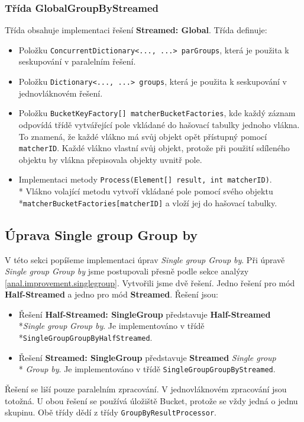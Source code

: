 \subsubsection{Třída GlobalGroupByStreamed}

Třída obsahuje implementaci řešení \textbf{Streamed: Global}.
Třída definuje:
\begin{itemize}
\item Položku \texttt{ConcurrentDictionary<..., ...> parGroups}, která je použita k seskupování v paralelním řešení.
\item Položku \texttt{Dictionary<..., ...> groups}, která je použita k seskupování v jednovláknovém řešení.
\item Položku \texttt{BucketKeyFactory[] matcherBucketFactories}, kde každý záznam odpovídá třídě vytvářející pole vkládané do hašovací tabulky jednoho vlákna.
To znamená, že každé vlákno má svůj objekt opět přístupný pomocí \texttt{matcherID}.
Každé vlákno vlastní svůj objekt, protože při použití sdíleného objektu by vlákna přepisovala objekty uvnitř pole.
\item Implementaci metody \texttt{Process(Element[] result, int matcherID)}.\\*
Vlákno volající metodu vytvoří vkládané pole pomocí svého objektu \\*\texttt{matcherBucketFactories[matcherID]} a vloží jej do hašovací tabulky.
\end{itemize}

\subsection{Úprava Single group Group by}

V této sekci popíšeme implementaci úprav \textit{Single group Group by}.
Při úpravě \textit{Single group Group by} jsme postupovali přesně podle sekce analýzy \ref{anal.improvement.singlegroup}.
Vytvořili jsme dvě řešení.
Jedno řešení pro mód \textbf{Half-Streamed} a jedno pro mód \textbf{Streamed}.
Řešení jsou:
\begin{itemize}
\item Řešení \textbf{Half-Streamed: SingleGroup} představuje \textbf{Half-Streamed} \\*\textit{Single} \textit{group} \textit{Group by}.
Je implementováno v třídě \\*\texttt{SingleGroupGroupByHalfStreamed}.
\item Řešení \textbf{Streamed: SingleGroup} představuje \textbf{Streamed} \textit{Single group}\\* \textit{Group by}.
Je implementováno v třídě \texttt{SingleGroupGroupByStreamed}.
\end{itemize}
Řešení se liší pouze paralelním zpracování. 
V jednovláknovém zpracování jsou totožná.
U obou řešení se používá úložiště Bucket, protože se vždy jedná o jednu skupinu.
Obě třídy dědí z třídy \texttt{GroupByResultProcessor}.

